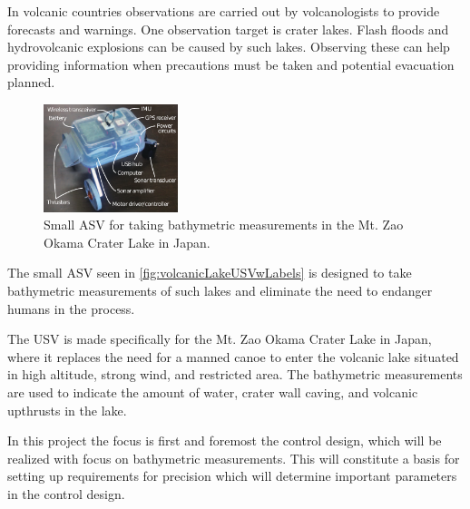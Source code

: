 In volcanic countries observations are carried out by volcanologists to provide forecasts and warnings. One observation target is crater lakes. Flash floods and hydrovolcanic explosions can be caused by such lakes. Observing these can help providing information when precautions must be taken and potential evacuation planned.\cite{AWatanabe}
%
\begin{figure}[H]
  \includegraphics[width=0.35\textwidth]{figures/volcanicLakeUSVwLabels.pdf}
  \caption{Small ASV for taking bathymetric measurements in the Mt. Zao Okama Crater Lake in Japan.\cite{AWatanabe}}
  \label{fig:volcanicLakeUSVwLabels}
\end{figure}
\vspace{-6mm}
%
The small ASV seen in \autoref{fig:volcanicLakeUSVwLabels} is designed to take bathymetric measurements of such lakes and eliminate the need to endanger humans in the process.\cite{AWatanabe}

The USV is made specifically for the Mt. Zao Okama Crater Lake in Japan, where it replaces the need for a manned canoe to enter the volcanic lake situated in high
altitude, strong wind, and restricted area. The bathymetric measurements are used to indicate the amount of water, crater wall caving, and volcanic upthrusts in the lake.\cite{AWatanabe}
%

In this project the focus is first and foremost the control design, which will be realized with focus on bathymetric measurements. This will constitute a basis for setting up requirements for precision which will determine important parameters in the control design.